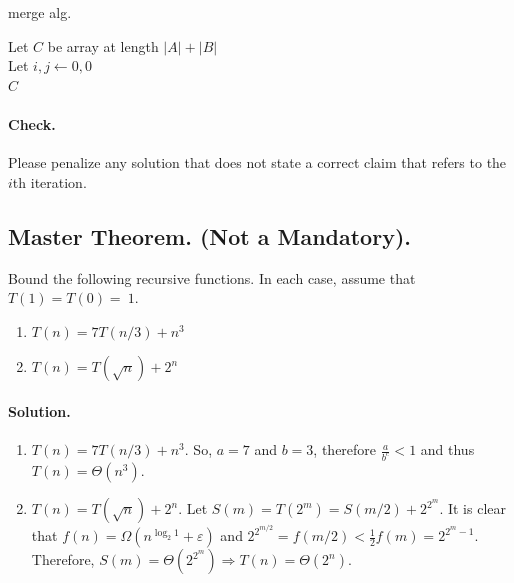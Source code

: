 \begin{algorithm}
\caption{merge alg.} \label{alg:merge}
         Let $C$ be array at length $|A| + |B|$ \\ 
         Let $i, j \leftarrow 0, 0$ \\ 
         \Return $C$  
\end{algorithm}


\ifdefined\CHECK

  \paragraph{Check.} Please penalize any solution that does not state a correct claim that refers to the $i$th iteration.

\fi


\fi

\subsection{Master Theorem. (Not a Mandatory).}
Bound the following recursive functions. In each case, assume that $T(1)=T(0)=~1$.
\begin{enumerate}
  \item $T(n) = 7T(n/3) + n^{3}$
  \item $T(n) = T(\sqrt{n}) + 2^n$ 
\end{enumerate}

\ifdefined\SOLUTION
  \paragraph{Solution.} 
\begin{enumerate}
 \item $T(n) = 7T(n/3) + n^{3}$. So, $a = 7$ and $b = 3$, therefore $\frac{a}{b^{c}} < 1$ and thus $T(n) = \Theta(n^{3})$.
\item $T(n) = T(\sqrt{n}) + 2^{n}$. Let $S(m) = T(2^{m}) = S(m/2) + 2^{2^{m}}$. It is clear that $f(n) = \Omega(n^{\log_{2}1} + \varepsilon)$ and $2^{2^{m/2}} = f(m/2) < \frac{1}{2}f(m) = 2^{2^{m}-1}$. Therefore, $S(m) = \Theta(2^{2^{m}}) \Rightarrow T(n) = \Theta(2^{n})$.
\end{enumerate}
\fi 

